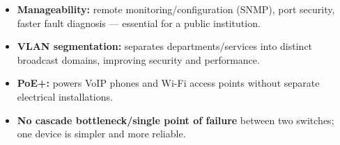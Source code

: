 \documentclass[11pt]{article}
\begin{document}
\begin{corrige}
\begin{itemize}
\item \textbf{Manageability:} remote monitoring/configuration (SNMP), port security, faster fault diagnosis — essential for a public institution.
\item \textbf{VLAN segmentation:} separates departments/services into distinct broadcast domains, improving security and performance.
\item \textbf{PoE+:} powers VoIP phones and Wi-Fi access points without separate electrical installations.
\item \textbf{No cascade bottleneck/single point of failure} between two switches; one device is simpler and more reliable.
\end{itemize}
\end{corrige}
\end{document}
